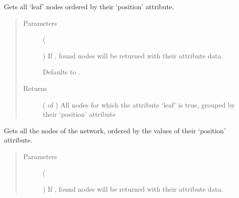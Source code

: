 \documentclass[letterpaper,10pt,english]{sphinxmanual}
\begin{document}
\begin{fulllineitems}
\begin{fulllineitems}
\label{\detokenize{cockatoo:cockatoo.KnitNetworkBase.all_leaves_by_position}}
Gets all ‘leaf’ nodes ordered by their ‘position’ attribute.
\begin{quote}\begin{description}
\item[{Parameters}] \leavevmode
{} (%
\begin{footnote}[71]\sphinxAtStartFootnote
{}
%
\end{footnote}\sphinxstyleliteralemphasis{\sphinxupquote{, }}) \textendash{} 
If , found nodes will be returned with their attribute
data.

Defaults to .


\item[{Returns}] \leavevmode
{} ( of ) \textendash{} All nodes for which the attribute ‘leaf’ is true, grouped by their
‘position’ attribute

\end{description}\end{quote}

\end{fulllineitems}


\begin{fulllineitems}
\label{\detokenize{cockatoo:cockatoo.KnitNetworkBase.all_nodes_by_position}}
Gets all the nodes of the network, ordered by the values of their
‘position’ attribute.
\begin{quote}\begin{description}
\item[{Parameters}] \leavevmode
{} (%
\begin{footnote}[72]\sphinxAtStartFootnote
{}
%
\end{footnote}\sphinxstyleliteralemphasis{\sphinxupquote{, }}) \textendash{} 
If , found nodes will be returned with their attribute
data.


\end{description}
\end{quote}
\end{fulllineitems}
\end{fulllineitems}
\end{document}
